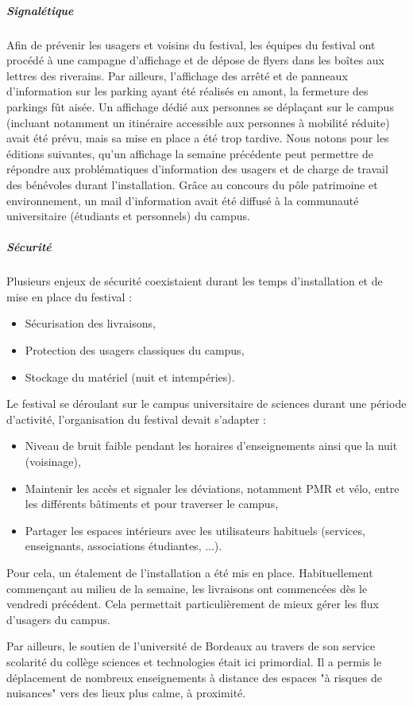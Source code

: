 \documentclass[12pt,a4paper]{report}
\begin{document}
\subparagraph{Signalétique}
Afin de prévenir les usagers et voisins du festival, les équipes du festival ont procédé à une campagne d'affichage et de dépose de flyers dans les boîtes aux lettres des riverains. Par ailleurs, l'affichage des arrêté et de panneaux d'information sur les parking ayant été réalisés en amont, la fermeture des parkings fût aisée. Un affichage dédié aux personnes se déplaçant sur le campus (incluant notamment un itinéraire accessible aux personnes à mobilité réduite) avait été prévu, mais sa mise en place a été trop tardive. Nous notons pour les éditions suivantes, qu'un affichage la semaine précédente peut permettre de répondre aux problématiques d'information des usagers et de charge de travail des bénévoles durant l'installation. Grâce au concours du pôle patrimoine et environnement, un mail d'information avait été diffusé à la communauté universitaire (étudiants et personnels) du campus.

\subparagraph{Sécurité}
Plusieurs enjeux de sécurité coexistaient durant les temps d'installation et de mise en place du festival : 
\begin{itemize}
\item Sécurisation des livraisons,
\item Protection des usagers classiques du campus,
\item Stockage du matériel (nuit et intempéries).
\end{itemize} 

Le festival se déroulant sur le campus universitaire de sciences durant une période d'activité, l'organisation du festival devait s'adapter : 
\begin{itemize}
\item Niveau de bruit faible pendant les horaires d'enseignements ainsi que la nuit (voisinage),
\item Maintenir les accès et signaler les déviations, notamment PMR et vélo, entre les différents bâtiments et pour traverser le campus,
\item Partager les espaces intérieurs avec les utilisateurs habituels (services, enseignants, associations étudiantes, ...).
\end{itemize}

Pour cela, un étalement de l'installation a été mis en place. Habituellement commençant au milieu de la semaine, les livraisons ont commencées dès le vendredi précédent. Cela permettait particulièrement de mieux gérer les flux d'usagers du campus.

Par ailleurs, le soutien de l'université de Bordeaux au travers de son service scolarité du collège sciences et technologies était ici primordial. Il a permis le déplacement de nombreux enseignements à distance des espaces "à risques de nuisances" vers des lieux plus calme, à proximité.
\end{document}
